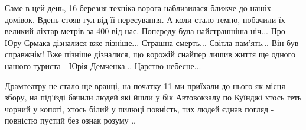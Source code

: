  
 
 
 
 


Саме в цей день, 16 березня техніка ворога наблизилася ближче до нашіх
домівок. Вдень стояв гул від її пересування. А коли стало темно, побачили їх
великий ліхтар метрів за 400 від нас. Попереду була найстрашніша ніч... Про Юру
Єрмака дізналися вже пізніше... Страшна смерть... Світла пам'ять... Він був
справжнім! Вже пізніше дізналися, що ворожій снайпер лишив життя ще одного
нашого туриста - Юрія Демченка... Царство небесне...


Драмтеатру не стало ще вранці, на початку 11 ми приїхали до нього як місця
збору, на під'їзді бачили людей які йшли у бік Автовокзалу по Куїнджі хтось
геть чорний у копоті, хтось білий у пилюці повність, тих людей єднав погляд -
повністю пустий без ознак розуму ..

